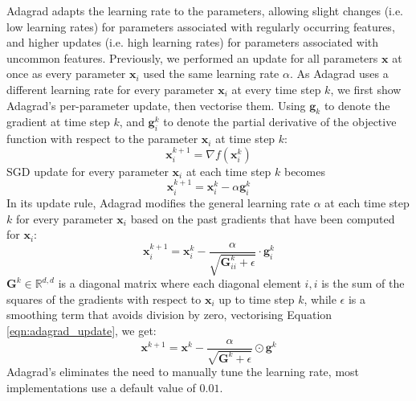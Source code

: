 \documentclass[12pt]{report}
\numberwithin{equation}{section}
\begin{document}
Adagrad \textbf{\cite{duchi2011adaptive}} adapts the learning rate to the parameters, allowing slight changes (i.e. low learning rates) for parameters associated with regularly occurring features, and higher updates (i.e. high learning rates) for parameters associated with uncommon features. Previously, we performed an update for all parameters $\bm{x}$ at once as every parameter $\bm{x}_i$ used the same learning rate $\alpha$. As Adagrad uses a different learning rate for every parameter $\bm{x}_i$ at every time step $k$, we first show Adagrad's per-parameter update, then vectorise them. Using $\bm{g}_k$ to denote the gradient at time step $k$, and $\bm{g}^k_{i}$ to denote the partial derivative of the objective function with respect to the parameter $\bm{x}_i$ at time step $k$:
\begin{equation}\label{eqn:adagrad_partial}
\bm{x}^{k+1}_i = \nabla f(\bm{x}^{k}_i)
\end{equation}\noindent
SGD update for every parameter $\bm{x}_i$ at each time step $k$ becomes
\begin{equation}\label{eqn:adagrad_sgd}
\bm{x}^{k+1}_i = \bm{x}^{k}_i - \alpha \bm{g}^{k}_i
\end{equation}\noindent
In its update rule, Adagrad modifies the general learning rate $\alpha$ at each time step $k$ for every parameter $\bm{x}_i$ based on the past gradients that have been computed for 
$\bm{x}_i$:
\begin{equation}\label{eqn:adagrad_update}
\bm{x}^{k+1}_i = \bm{x}^{k}_i - \dfrac{\alpha}{\sqrt{\bm{G}^k_{ii} + \epsilon}} \cdot \bm{g}^{k}_i
\end{equation}\noindent
$\bm{G}^k \in \mathbb{R}^{d,d}$ is a diagonal matrix where each diagonal element $i,i$ is the sum of the squares of the gradients with respect to $\bm{x}_i$ up to time step $k$, while $\epsilon$ is a smoothing term that avoids division by zero, vectorising Equation \ref{eqn:adagrad_update}, we get:
\begin{equation}\label{eqn:adagrad}
\bm{x}^{k+1}= \bm{x}^{k} - \dfrac{\alpha}{\sqrt{\bm{G}^k + \epsilon}} \odot \bm{g}^{k}
\end{equation}\noindent
Adagrad's eliminates the need to manually tune the learning rate, most implementations use a default value of $0.01$. 
\end{document}
